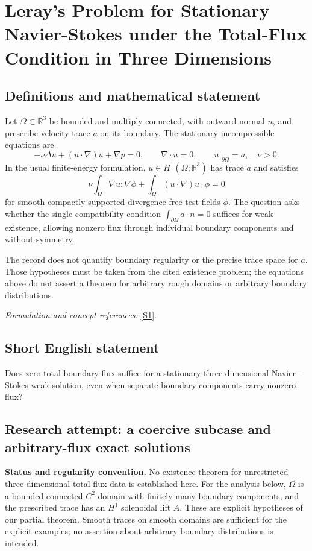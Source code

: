 \documentclass[11pt]{article}
\begin{document}
\section*{\texorpdfstring{Leray's Problem for Stationary Navier-Stokes under the Total-Flux Condition in Three Dimensions}{Leray's Problem for Stationary Navier-Stokes under the Total-Flux Condition in Three Dimensions}}\label{statement}
\subsection{Definitions and mathematical statement}
Let $\Omega\subset{\mathbb{R}}^3$ be bounded and multiply connected, with outward normal $n$, and prescribe velocity trace $a$ on its boundary. The stationary incompressible equations are
\[
 -\nu\Delta u+(u\cdot\nabla)u+\nabla p=0,
 \qquad\nabla\cdot u=0,\qquad u|_{\partial\Omega}=a,
 \quad\nu>0.
\]
In the usual finite-energy formulation, $u\in H^1(\Omega;{\mathbb{R}}^3)$ has trace $a$ and satisfies
\[
 \nu\int_\Omega\nabla u:\nabla\phi
 +\int_\Omega (u\cdot\nabla)u\cdot\phi=0
\]
for smooth compactly supported divergence-free test fields $\phi$. The question asks whether the single compatibility condition $\int_{\partial\Omega}a\cdot n=0$ suffices for weak existence, allowing nonzero flux through individual boundary components and without symmetry.

The record does not quantify boundary regularity or the precise trace space for $a$. Those hypotheses must be taken from the cited existence problem; the equations above do not assert a theorem for arbitrary rough domains or arbitrary boundary distributions.
\par\smallskip\textit{Formulation and concept references:} \href{https://ejde.math.txstate.edu/Volumes/2023/26/foreidooni.pdf}{[S1]}.

\subsection{Short English statement}
Does zero total boundary flux suffice for a stationary three-dimensional Navier--Stokes weak solution, even when separate boundary components carry nonzero flux?
\subsection{Research attempt: a coercive subcase and arbitrary-flux exact solutions}
\textbf{Status and regularity convention.} No existence theorem for unrestricted three-dimensional total-flux data is established here. For the analysis below, $\Omega$ is a bounded connected $C^2$ domain with finitely many boundary components, and the prescribed trace has an $H^1$ solenoidal lift $A$. These are explicit hypotheses of our partial theorem. Smooth traces on smooth domains are sufficient for the explicit examples; no assertion about arbitrary boundary distributions is intended.
\end{document}
